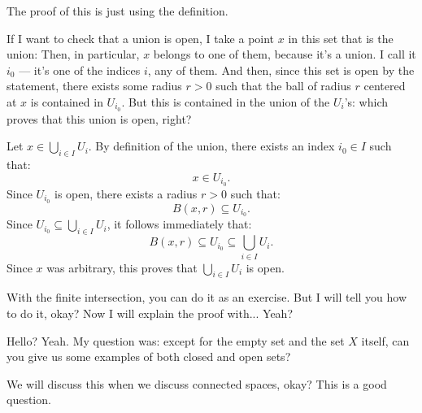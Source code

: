 \begin{proofWrapper}

\begin{speech}[00:15:45 - 00:17:40]
The proof of this is just using the definition. 

If I want to check that a union is open, I take a point $x$ in this set that is the union:  Then, in particular, $x$ belongs to one of them, because it's a union. I call it $i_0$ --- it's one of the indices $i$, any of them.  And then, since this set is open by the statement, there exists some radius $r > 0$  such that the ball of radius $r$ centered at $x$ is contained in $U_{i_0}$. But this is contained in the union of the $U_i$'s:  which proves that this union is open, right?
\end{speech}

\begin{content}
Let $x \in \bigcup_{i \in I} U_i$.
By definition of the union, there exists an index $i_0 \in I$ such that:
\[
x \in U_{i_0}.
\]
Since $U_{i_0}$ is open, there exists a radius $r > 0$ such that:
\[
B(x, r) \subseteq U_{i_0}.
\]
Since $U_{i_0} \subseteq \bigcup_{i \in I} U_i$, it follows immediately that:
\[
B(x, r) \subseteq U_{i_0} \subseteq \bigcup_{i \in I} U_i.
\]
Since $x$ was arbitrary, this proves that $\bigcup_{i \in I} U_i$ is open.
\end{content}

\begin{speech}[00:17:40 - 00:18:04]
With the finite intersection, you can do it as an exercise. But I will tell you how to do it, okay? Now I will explain the proof with... Yeah? 
\end{speech}

\begin{student}
Hello? Yeah. My question was: except for the empty set and the set $X$ itself, can you give us some examples of both closed and open sets?
\end{student}

\begin{speech}[00:18:16 - 00:19:06]
We will discuss this when we discuss connected spaces, okay? This is a good question.


\end{speech}
\end{proofWrapper}
